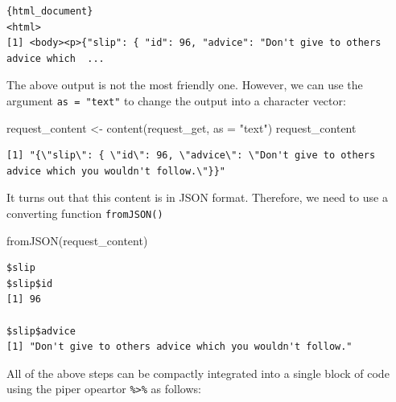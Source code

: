 \documentclass[
]{book}
\newenvironment{Shaded}{\begin{snugshade}}{\end{snugshade}}
\newcommand{\AttributeTok}[1]{\textcolor[rgb]{0.77,0.63,0.00}{#1}}
\newcommand{\CommentTok}[1]{\textcolor[rgb]{0.56,0.35,0.01}{\textit{#1}}}
\newcommand{\FunctionTok}[1]{\textcolor[rgb]{0.00,0.00,0.00}{#1}}
\newcommand{\NormalTok}[1]{#1}
\newcommand{\OtherTok}[1]{\textcolor[rgb]{0.56,0.35,0.01}{#1}}
\newcommand{\SpecialCharTok}[1]{\textcolor[rgb]{0.00,0.00,0.00}{#1}}
\newcommand{\StringTok}[1]{\textcolor[rgb]{0.31,0.60,0.02}{#1}}
\begin{document}
\begin{verbatim}
{html_document}
<html>
[1] <body><p>{"slip": { "id": 96, "advice": "Don't give to others advice which  ...
\end{verbatim}

The above output is not the most friendly one. However, we can use the argument
\texttt{as\ =\ "text"} to change the output into a character vector:

\begin{Shaded}
\begin{Highlighting}[]
\NormalTok{request\_content }\OtherTok{\textless{}{-}} \FunctionTok{content}\NormalTok{(request\_get, }\AttributeTok{as =} \StringTok{"text"}\NormalTok{)}
\NormalTok{request\_content}
\end{Highlighting}
\end{Shaded}

\begin{verbatim}
[1] "{\"slip\": { \"id\": 96, \"advice\": \"Don't give to others advice which you wouldn't follow.\"}}"
\end{verbatim}

It turns out that this content is in JSON format. Therefore, we need to use
a converting function \texttt{fromJSON()}

\begin{Shaded}
\begin{Highlighting}[]
\FunctionTok{fromJSON}\NormalTok{(request\_content)}
\end{Highlighting}
\end{Shaded}

\begin{verbatim}
$slip
$slip$id
[1] 96

$slip$advice
[1] "Don't give to others advice which you wouldn't follow."
\end{verbatim}

All of the above steps can be compactly integrated into a single block of code
using the piper opeartor \texttt{\%\textgreater{}\%} as follows:

\begin{Shaded}
\end{Shaded}
\end{document}
